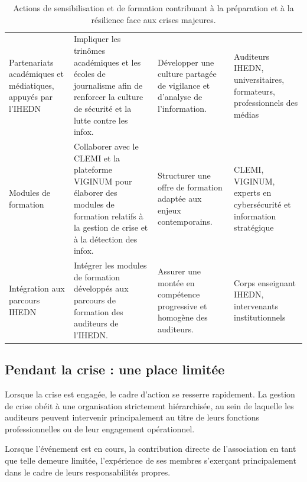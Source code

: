 \documentclass[12pt,a4paper]{article}
\begin{document}
\begin{table}[H]
{\begin{tabular}{@{}>{\raggedright\arraybackslash}p{3.2cm}>{\raggedright\arraybackslash}p{6.2cm}>{\raggedright\arraybackslash}p{4.5cm}>{\raggedright\arraybackslash}p{4.5cm}@{}}
\addlinespace

Partenariats académiques et médiatiques, appuyés par l'IHEDN &
Impliquer les trinômes académiques et les écoles de journalisme afin de renforcer la culture de sécurité et la lutte contre les infox. &
Développer une culture partagée de vigilance et d'analyse de l'information. &
Auditeurs IHEDN, universitaires, formateurs, professionnels des médias \\

\addlinespace

Modules de formation &
Collaborer avec le CLEMI et la plateforme VIGINUM pour élaborer des modules de formation relatifs à la gestion de crise et à la détection des infox. &
Structurer une offre de formation adaptée aux enjeux contemporains. &
CLEMI, VIGINUM, experts en cybersécurité et information stratégique \\

\addlinespace

Intégration aux parcours IHEDN &
Intégrer les modules de formation développés aux parcours de formation des auditeurs de l'IHEDN. &
Assurer une montée en compétence progressive et homogène des auditeurs. &
Corps enseignant IHEDN, intervenants institutionnels \\

\bottomrule
\end{tabular}
}

\caption[Actions de sensibilisation et de formation]{Actions de sensibilisation et de formation contribuant à la préparation et à la résilience face aux crises majeures.}
\label{tab:sensibilisation_resilience}

\end{table}

\subsection{Pendant la crise : une place limitée}

Lorsque la crise est engagée, le cadre d'action se resserre rapidement. La gestion de crise obéit à une organisation strictement hiérarchisée, au sein de laquelle les auditeurs peuvent intervenir principalement au titre de leurs fonctions professionnelles ou de leur engagement opérationnel.

Lorsque l'événement est en cours, la contribution directe de l'association en tant que telle demeure limitée, l'expérience de ses membres s'exerçant principalement dans le cadre de leurs responsabilités propres.
\end{document}
